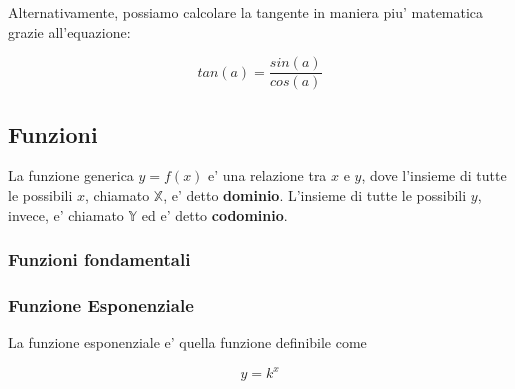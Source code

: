 \documentclass{article}
\begin{document}
{{    Alternativamente, possiamo calcolare la tangente in maniera piu' matematica grazie all'equazione:

    $$ tan(a) = \frac{sin(a)}{cos(a)} $$

    \pagebreak

    \subsection{Funzioni}
    La funzione generica $ y = f(x) $ e' una relazione tra $ x $ e $ y $, dove l'insieme di tutte le possibili $ x $, chiamato $ \mathbb{X} $, e' detto \textbf{dominio}. L'insieme di tutte le possibili $ y $, invece, e' chiamato $ \mathbb{Y} $ ed e' detto \textbf{codominio}.

    \subsubsection{Funzioni fondamentali} %

    \pagebreak

    \subsubsection{Funzione Esponenziale} %
    La funzione esponenziale e' quella funzione definibile come

    $$ y = k^x $$

}}
\end{document}
